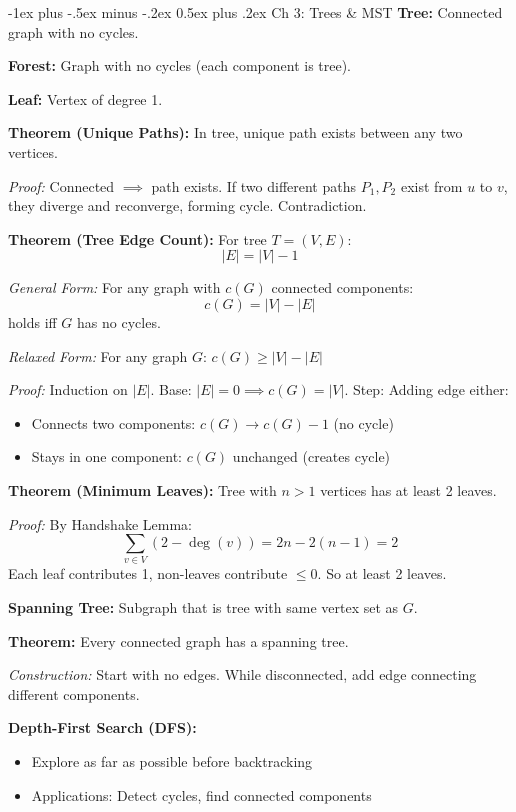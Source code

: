 \documentclass[10pt,landscape]{article}
\makeatletter
\renewcommand{\section}{\@startsection{section}{1}{0mm}%
                                {-1ex plus -.5ex minus -.2ex}%
                                {0.5ex plus .2ex}%
                                {\normalfont\large\bfseries}}
\makeatother
\begin{document}
\begin{multicols}{3}
\section{Ch 3: Trees \& MST}
\textbf{Tree:} Connected graph with no cycles.

\textbf{Forest:} Graph with no cycles (each component is tree).

\textbf{Leaf:} Vertex of degree 1.

\textbf{Theorem (Unique Paths):} In tree, unique path exists between any two vertices.

\textit{Proof:} Connected $\implies$ path exists. If two different paths $P_1, P_2$ exist from $u$ to $v$, they diverge and reconverge, forming cycle. Contradiction.

\textbf{Theorem (Tree Edge Count):} For tree $T = (V, E)$:
$$|E| = |V| - 1$$

\textit{General Form:} For any graph with $c(G)$ connected components:
$$c(G) = |V| - |E|$$
holds iff $G$ has no cycles.

\textit{Relaxed Form:} For any graph $G$: $c(G) \geq |V| - |E|$

\textit{Proof:} Induction on $|E|$. Base: $|E| = 0 \implies c(G) = |V|$.
Step: Adding edge either:
\begin{itemize}
\item Connects two components: $c(G) \to c(G)-1$ (no cycle)
\item Stays in one component: $c(G)$ unchanged (creates cycle)
\end{itemize}

\textbf{Theorem (Minimum Leaves):} Tree with $n > 1$ vertices has at least 2 leaves.

\textit{Proof:} By Handshake Lemma:
$$\sum_{v \in V} (2 - \deg(v)) = 2n - 2(n-1) = 2$$
Each leaf contributes 1, non-leaves contribute $\leq 0$. So at least 2 leaves.

\textbf{Spanning Tree:} Subgraph that is tree with same vertex set as $G$.

\textbf{Theorem:} Every connected graph has a spanning tree.

\textit{Construction:} Start with no edges. While disconnected, add edge connecting different components.

\textbf{Depth-First Search (DFS):}
\begin{itemize}
    \item Explore as far as possible before backtracking
    \item Applications: Detect cycles, find connected components
\end{itemize}


\end{multicols}
\end{document}
